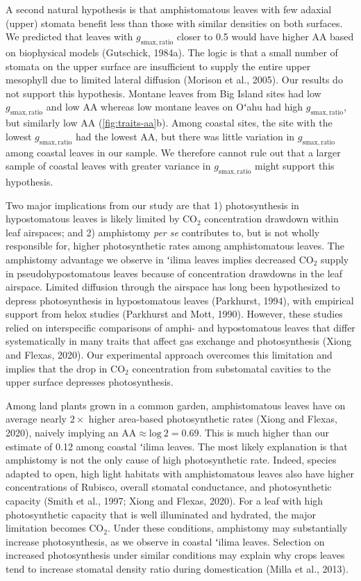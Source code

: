 \documentclass[
  letterpaper,
  DIV=11,
  numbers=noendperiod]{scrartcl}
\begin{document}
A second natural hypothesis is that amphistomatous leaves with few
adaxial (upper) stomata benefit less than those with similar densities
on both surfaces. We predicted that leaves with
\(g_\mathrm{smax,ratio}\) closer to 0.5 would have higher
\(\mathrm{AA}\) based on biophysical models (Gutschick, 1984a). The
logic is that a small number of stomata on the upper surface are
insufficient to supply the entire upper mesophyll due to limited lateral
diffusion (Morison et al., 2005). Our results do not support this
hypothesis. Montane leaves from Big Island sites had low
\(g_\mathrm{smax,ratio}\) and low \(\mathrm{AA}\) whereas low montane
leaves on Oʻahu had high \(g_\mathrm{smax,ratio}\), but similarly low
\(\mathrm{AA}\) (\autoref{fig:traits-aa}b). Among coastal sites, the
site with the lowest \(g_\mathrm{smax,ratio}\) had the lowest
\(\mathrm{AA}\), but there was little variation in
\(g_\mathrm{smax,ratio}\) among coastal leaves in our sample. We
therefore cannot rule out that a larger sample of coastal leaves with
greater variance in \(g_\mathrm{smax,ratio}\) might support this
hypothesis.

Two major implications from our study are that 1) photosynthesis in
hypostomatous leaves is likely limited by CO\(_2\) concentration
drawdown within leaf airspaces; and 2) amphistomy \emph{per se}
contributes to, but is not wholly responsible for, higher photosynthetic
rates among amphistomatous leaves. The amphistomy advantage we observe
in ʻilima leaves implies decreased CO\(_2\) supply in
pseudohypostomatous leaves because of concentration drawdowns in the
leaf airspace. Limited diffusion through the airspace has long been
hypothesized to depress photosynthesis in hypostomatous leaves
(Parkhurst, 1994), with empirical support from helox studies (Parkhurst
and Mott, 1990). However, these studies relied on interspecific
comparisons of amphi- and hypostomatous leaves that differ
systematically in many traits that affect gas exchange and
photosynthesis (Xiong and Flexas, 2020). Our experimental approach
overcomes this limitation and implies that the drop in CO\(_2\)
concentration from substomatal cavities to the upper surface depresses
photosynthesis.

Among land plants grown in a common garden, amphistomatous leaves have
on average nearly \(2\times\) higher area-based photosynthetic rates
(Xiong and Flexas, 2020), naively implying an
\(\mathrm{AA} \approx \text{log}~2 = 0.69\). This is much higher than
our estimate of 0.12 among coastal ʻilima leaves. The most likely
explanation is that amphistomy is not the only cause of high
photosynthetic rate. Indeed, species adapted to open, high light
habitats with amphistomatous leaves also have higher concentrations of
Rubisco, overall stomatal conductance, and photosynthetic capacity
(Smith et al., 1997; Xiong and Flexas, 2020). For a leaf with high
photosynthetic capacity that is well illuminated and hydrated, the major
limitation becomes CO\(_2\). Under these conditions, amphistomy may
substantially increase photosynthesis, as we observe in coastal ʻilima
leaves. Selection on increased photosynthesis under similar conditions
may explain why crops leaves tend to increase stomatal density ratio
during domestication (Milla et al., 2013).
\end{document}
